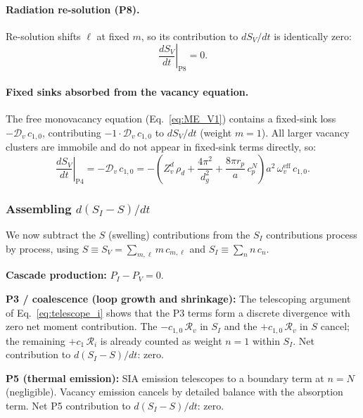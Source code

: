 \documentclass[pdflatex,sn-basic]{sn-jnl} %
\begin{document}
\paragraph{Radiation re-solution (P8).}
Re-solution shifts $\ell$ at fixed $m$, so its contribution to $dS_V/dt$
is identically zero:
\begin{equation}
    \left.\frac{dS_V}{dt}\right|_{\mathrm{P8}} = 0.
\end{equation}

\paragraph{Fixed sinks absorbed from the vacancy equation.}
The free monovacancy equation (Eq.~\ref{eq:ME_V1}) contains a fixed-sink
loss $-\mathcal{D}_v\,c_{1,0}$, contributing $-1 \cdot \mathcal{D}_v
\,c_{1,0}$ to $dS_V/dt$ (weight $m=1$). All larger vacancy clusters are
immobile and do not appear in fixed-sink terms directly, so:
\begin{equation}\label{eq:P4_SV}
    \left.\frac{dS_V}{dt}\right|_{\mathrm{P4}}
    = -\mathcal{D}_v\,c_{1,0}
    = -\left(Z_v^d\,\rho_d + \frac{4\pi^2}{d_g^2}
      + \frac{8\pi r_p}{a}\,c_p^N\right) a^2\,\omega_v^{\mathrm{eff}}\,c_{1,0}.
\end{equation}

\subsubsection*{Assembling $d(S_I - S)/dt$}

We now subtract the $S$ (swelling) contributions from the $S_I$
contributions process by process, using $S \equiv S_V =
\sum_{m,\ell} m\,c_{m,\ell}$ and $S_I \equiv \sum_n n\,c_n$.

\textbf{Cascade production:} $P_I - P_V = 0$. \checkmark

\textbf{P3 / coalescence (loop growth and shrinkage):}
The telescoping argument of Eq.~\eqref{eq:telescope_i} shows that the
P3 terms form a discrete divergence with zero net moment contribution.
The $-c_{1,0}\,\mathcal{R}_v$ in $S_I$ and the $+c_{1,0}\,\mathcal{R}_v$
in $S$ cancel; the remaining $+c_1\,\mathcal{R}_i$ is already counted as
weight $n=1$ within $S_I$. Net contribution to $d(S_I - S)/dt$: zero.
\checkmark

\textbf{P5 (thermal emission):}
SIA emission telescopes to a boundary term at $n=N$ (negligible). Vacancy
emission cancels by detailed balance with the absorption term. Net P5
contribution to $d(S_I - S)/dt$: zero. \checkmark
\end{document}
